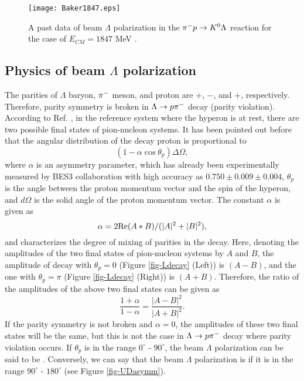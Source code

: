 \begin{figure}[h]
  \centering
  \texttt{[image: Baker1847.eps]}
  \caption{A past data of beam $\Lambda$ polarization in the $\pi^- p \to K^0 \Lambda$ reaction for the case of $E_{CM}=1847$ MeV \cite{Baker}.}
  \label{fig-Baker1847}
\end{figure}

\subsection{Physics of beam $\Lambda$ polarization}
\label{sec-Pl-phys}

The parities of $\Lambda$ baryon, $\pi^{-}$ meson, and proton are $+$, $-$, and $+$, respectively. Therefore, parity symmetry is broken in $\Lambda\to p\pi^{-}$ decay (parity violation). According to Ref. \cite{Lee1957}, in the reference system where the hyperon is at rest, there are two possible final states of pion-nucleon systems. It has been pointed out before \cite{Weldman} that the angular distribution of the decay proton is proportional to 
\begin{equation}
  (1-\alpha\cos{\theta_{p}}) \Delta\Omega,
\end{equation}
where $\alpha$ is an asymmetry parameter, which has already been experimentally measured by BES3 collaboration \cite{Alpha} with high accuracy as $0.750\pm0.009\pm0.004$, $\theta_{p}$ is the angle between the proton momentum vector and the spin of the hyperon, and $d\Omega$ is the solid angle of the proton momentum vector. The constant $\alpha$ is given as 
\begin{equation}
  \alpha = 2 {\rm Re}(A*B) / (|A|^{2} + |B|^{2}),
\end{equation}
and characterizes the degree of mixing of parities in the decay. Here, denoting the amplitudes of the two final states of pion-nucleon systems by $A$ and $B$, the amplitude of decay with $\theta_{p}=0$ (Figure \ref{fig-Ldecay} (Left)) is $(A-B)$, and the one with $\theta_{p}=\pi$ (Figure \ref{fig-Ldecay} (Right)) is $(A+B)$. Therefore, the ratio of the amplitudes of the above two final states can be given as
\begin{equation}
  \frac{1+\alpha}{1-\alpha} = \frac{|A-B|^{2}}{|A+B|^{2}}.
\end{equation}
If the parity symmetry is not broken and $\alpha=0$, the amplitudes of these two final states will be the same, but this is not the case in $\Lambda\to p\pi^{-}$ decay where parity violation occurs. If $\theta_{p}$ is in the range $0^{\circ}$ - $90^{\circ}$, the beam $\Lambda$ polarization can be said to be . Conversely, we can say that the beam $\Lambda$ polarization is  if it is in the range $90^{\circ}$ - $180^{\circ}$ (see Figure \ref{fig-UDasymm}). 

